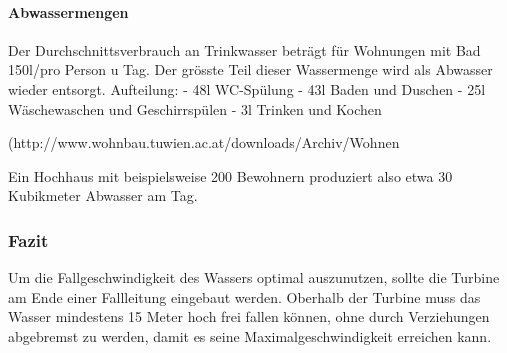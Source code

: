\paragraph{Abwassermengen}
Der Durchschnittsverbrauch an Trinkwasser beträgt für Wohnungen mit Bad 150l/pro Person u Tag. Der grösste Teil dieser Wassermenge wird als Abwasser wieder entsorgt. 
\newline
Aufteilung:
\newline
- 48l \; WC-Spülung
\newline
- 43l \; Baden und Duschen
\newline
- 25l \; Wäschewaschen und Geschirrspülen
\newline
- 3l \;  Trinken und Kochen
\newline

(http://www.wohnbau.tuwien.ac.at/downloads/Archiv/Wohnen%

Ein Hochhaus mit beispielsweise 200 Bewohnern produziert also etwa 30 Kubikmeter Abwasser am Tag.

\subsubsection{Fazit}
Um die Fallgeschwindigkeit des Wassers optimal auszunutzen, sollte die Turbine am Ende einer Fallleitung eingebaut werden. Oberhalb der Turbine muss das Wasser mindestens 15 Meter hoch frei fallen können, ohne durch Verziehungen abgebremst zu werden, damit es seine Maximalgeschwindigkeit erreichen kann. 


\clearpage 






